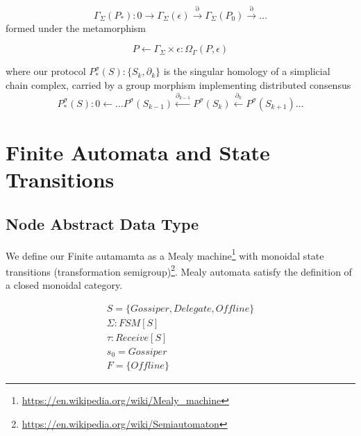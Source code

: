 \documentclass{article}
\begin{document}
\begin{equation} \label{eq1}
\Gamma_\Sigma(P_*):  0 \xrightarrow{~} \Gamma_\Sigma(\epsilon) \xrightarrow{\partial} \Gamma_\Sigma(P_0) \xrightarrow{\partial} \dots
\end{equation} \label{eq1}
formed under the metamorphism

\begin{equation} \label{eq1}
P \leftarrow \Gamma_\Sigma \times \epsilon :\Omega_\Gamma(P, \epsilon)
\end{equation} \label{eq1}

where our protocol $P^\sigma_{*}(S):\{S_k, \partial_k\}$ is the singular homology of a simplicial chain complex, carried by a group morphism implementing distributed consensus
\begin{equation} \label{eq1}
P^\sigma_{*}(S): 0 \leftarrow \dots P^\sigma(S_{k-1})\xleftarrow {\partial_{k-1}} P^\sigma(S_{k})\xleftarrow {\partial_{k}} P^\sigma(S_{k+1}) \dots
\end{equation} \label{eq1}

\section{Finite Automata and State Transitions}
\subsection{Node Abstract Data Type}
We define our Finite autamamta as a Mealy machine\footnote{\url{https://en.wikipedia.org/wiki/Mealy_machine}} with monoidal state transitions (transformation semigroup)\footnote{\url{https://en.wikipedia.org/wiki/Semiautomaton}}. Mealy automata satisfy the definition of a closed monoidal category.

\begin{align*}
S = \{Gossiper, Delegate, Offline\} \\
\Sigma: FSM[S] \\
\tau: Receive[S] \\
s_0 = Gossiper \\
F = \{Offline\}
\end{align*}
\end{document}
